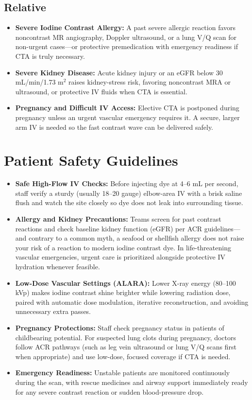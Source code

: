 \subsection{Relative}
\begin{itemize}
    \item \textbf{Severe Iodine Contrast Allergy:} A past severe allergic reaction favors noncontrast MR angiography, Doppler ultrasound, or a lung V/Q scan for non-urgent cases---or protective premedication with emergency readiness if CTA is truly necessary.
    \item \textbf{Severe Kidney Disease:} Acute kidney injury or an eGFR below 30 mL/min/1.73 m$^2$ raises kidney-stress risk, favoring noncontrast MRA or ultrasound, or protective IV fluids when CTA is essential.
    \item \textbf{Pregnancy and Difficult IV Access:} Elective CTA is postponed during pregnancy unless an urgent vascular emergency requires it. A secure, larger arm IV is needed so the fast contrast wave can be delivered safely.
\end{itemize}

\section{Patient Safety Guidelines}
\begin{itemize}
    \item \textbf{Safe High-Flow IV Checks:} Before injecting dye at 4--6 mL per second, staff verify a sturdy (usually 18--20 gauge) elbow-area IV with a brisk saline flush and watch the site closely so dye does not leak into surrounding tissue.
    \item \textbf{Allergy and Kidney Precautions:} Teams screen for past contrast reactions and check baseline kidney function (eGFR) per ACR guidelines---and contrary to a common myth, a seafood or shellfish allergy does not raise your risk of a reaction to modern iodine contrast dye. In life-threatening vascular emergencies, urgent care is prioritized alongside protective IV hydration whenever feasible.
    \item \textbf{Low-Dose Vascular Settings (ALARA):} Lower X-ray energy (80--100 kVp) makes iodine contrast shine brighter while lowering radiation dose, paired with automatic dose modulation, iterative reconstruction, and avoiding unnecessary extra passes.
    \item \textbf{Pregnancy Protections:} Staff check pregnancy status in patients of childbearing potential. For suspected lung clots during pregnancy, doctors follow ACR pathways (such as leg vein ultrasound or lung V/Q scans first when appropriate) and use low-dose, focused coverage if CTA is needed.
    \item \textbf{Emergency Readiness:} Unstable patients are monitored continuously during the scan, with rescue medicines and airway support immediately ready for any severe contrast reaction or sudden blood-pressure drop.
\end{itemize}

